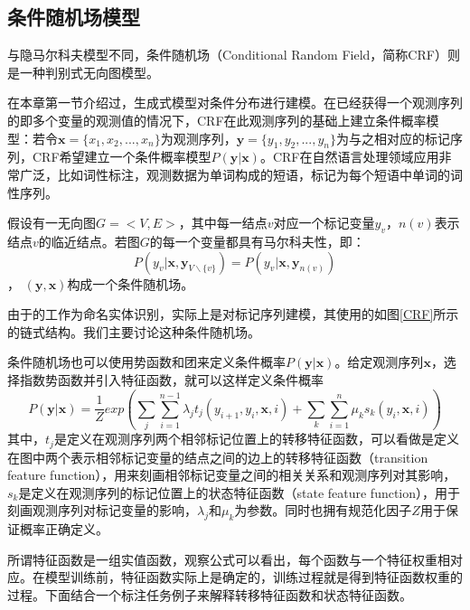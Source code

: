 \subsection{条件随机场模型}

与隐马尔科夫模型不同，条件随机场（Conditional Random Field，简称CRF）则是一种判别式无向图模型。

在本章第一节介绍过，生成式模型对条件分布进行建模。在已经获得一个观测序列的即多个变量的观测值的情况下，CRF在此观测序列的基础上建立条件概率模型：若令\(\boldsymbol{x}=\{x_1, x_2, ..., x_n\}\)为观测序列，\(\boldsymbol{y} = \{y_1, y_2, ..., y_n\}\)为与之相对应的标记序列，CRF希望建立一个条件概率模型\(P(\boldsymbol{y} | \boldsymbol{x})\)。CRF在自然语言处理领域应用非常广泛，比如词性标注，观测数据为单词构成的短语，标记为每个短语中单词的词性序列。

假设有一无向图\(G=<V,E>\)，其中每一结点\(v\)对应一个标记变量\(y_v\)，\(n(v)\)表示结点\(v\)的临近结点。若图\(G\)的每一个变量都具有马尔科夫性，即：
\begin{equation}P(y_v | \boldsymbol{x}, \boldsymbol{y}_{ V \backslash \{v\} })=P(y_v | \boldsymbol{x}, \boldsymbol{y}_{n(v)})\end{equation}，
\((\boldsymbol{y},\boldsymbol{x})\)构成一个条件随机场。

由于的工作为命名实体识别，实际上是对标记序列建模，其使用的如图\ref{CRF}所示的链式结构。我们主要讨论这种条件随机场。

条件随机场也可以使用势函数和团来定义条件概率\(P(\boldsymbol{y} | \boldsymbol{x})\)。给定观测序列\(\boldsymbol{x}\)，选择指数势函数并引入特征函数，就可以这样定义条件概率
\begin{equation}P(\boldsymbol{y} | \boldsymbol{x}) = \frac{1}{Z} exp(\sum_j \sum_{i=1}^{n-1}\lambda_j t_j (y_{i+1}, y_i, \boldsymbol{x}, i) + \sum_k \sum_{i=1}^n \mu_k s_k (y_i, \boldsymbol{x}, i))\end{equation}
其中，\(t_j\)是定义在观测序列两个相邻标记位置上的转移特征函数，可以看做是定义在图中两个表示相邻标记变量的结点之间的边上的转移特征函数（transition feature function），用来刻画相邻标记变量之间的相关关系和观测序列对其影响，\(s_k\)是定义在观测序列的标记位置上的状态特征函数（state feature function），用于刻画观测序列对标记变量的影响，\(\lambda_j\)和\(\mu_k\)为参数。同时也拥有规范化因子\(Z\)用于保证概率正确定义。

所谓特征函数是一组实值函数，观察公式可以看出，每个函数与一个特征权重相对应。在模型训练前，特征函数实际上是确定的，训练过程就是得到特征函数权重的过程。下面结合一个标注任务例子来解释转移特征函数和状态特征函数。

